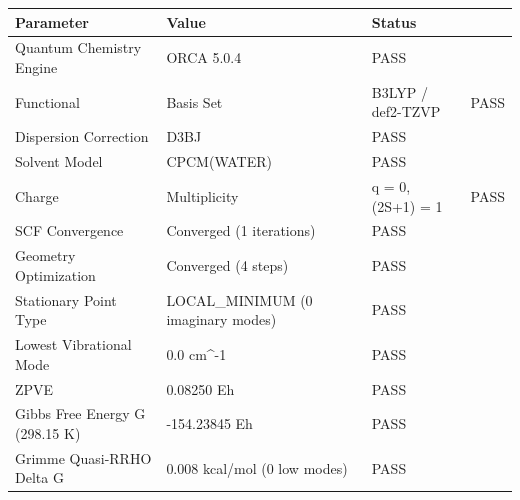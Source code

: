 \begin{tabular}{lll}
\toprule
Parameter & Value & Status \\
\midrule
Quantum Chemistry Engine & ORCA 5.0.4 & PASS \\
Functional & Basis Set & B3LYP / def2-TZVP & PASS \\
Dispersion Correction & D3BJ & PASS \\
Solvent Model & CPCM(WATER) & PASS \\
Charge & Multiplicity & q = 0, (2S+1) = 1 & PASS \\
SCF Convergence & Converged (1 iterations) & PASS \\
Geometry Optimization & Converged (4 steps) & PASS \\
Stationary Point Type & LOCAL_MINIMUM (0 imaginary modes) & PASS \\
Lowest Vibrational Mode & 0.0 cm^-1 & PASS \\
ZPVE & 0.08250 Eh & PASS \\
Gibbs Free Energy G (298.15 K) & -154.23845 Eh & PASS \\
Grimme Quasi-RRHO Delta G & 0.008 kcal/mol (0 low modes) & PASS \\
\bottomrule
\end{tabular}
